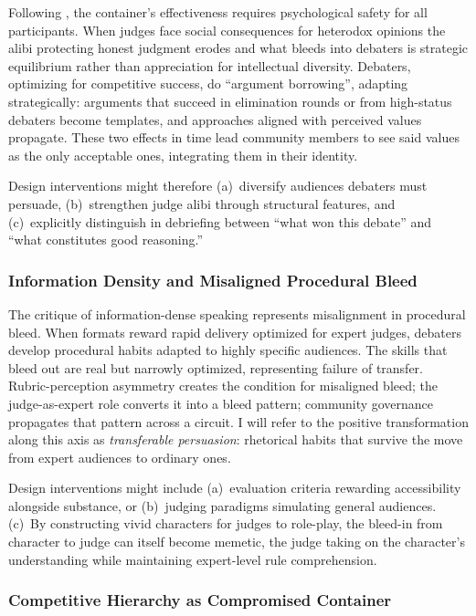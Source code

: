 \documentclass[12pt]{article}
\begin{document}
Following \textcite{bowman2025transformative}, the container's effectiveness requires psychological safety for all participants. When judges face social consequences for heterodox opinions the alibi protecting honest judgment erodes and what bleeds into debaters is strategic equilibrium rather than appreciation for intellectual diversity. Debaters, optimizing for competitive success, do ``argument borrowing'', adapting strategically: arguments that succeed in elimination rounds or from high-status debaters become templates, and approaches aligned with perceived values propagate. These two effects in time lead community members to see said values as the only acceptable ones, integrating them in their identity. 

Design interventions might therefore (a)~diversify audiences debaters must persuade, (b)~strengthen judge alibi through structural features, and (c)~explicitly distinguish in debriefing between ``what won this debate'' and ``what constitutes good reasoning.''

\subsubsection{Information Density and Misaligned Procedural Bleed}

The critique of information-dense speaking represents misalignment in procedural bleed. When formats reward rapid delivery optimized for expert judges, debaters develop procedural habits adapted to highly specific audiences. The skills that bleed out are real but narrowly optimized, representing failure of transfer. Rubric-perception asymmetry creates the condition for misaligned bleed; the judge-as-expert role converts it into a bleed pattern; community governance propagates that pattern across a circuit. I will refer to the positive transformation along this axis as \textit{transferable persuasion}: rhetorical habits that survive the move from expert audiences to ordinary ones.

Design interventions might include (a)~evaluation criteria rewarding accessibility alongside substance, or (b)~judging paradigms simulating general audiences. (c)~By constructing vivid characters for judges to role-play, the bleed-in from character to judge can itself become memetic, the judge taking on the character's understanding while maintaining expert-level rule comprehension.

\subsubsection{Competitive Hierarchy as Compromised Container}
\end{document}

